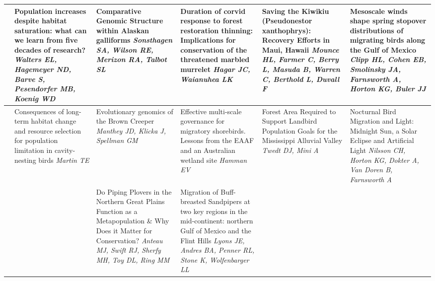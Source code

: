 \begin{tabular}{|x{0.75cm}|a{2.25cm}|x{2.25cm}|x{2.25cm}|x{2.25cm}|x{2.25cm}|}
\hline
{}&Population increases despite habitat saturation: what can we learn from five decades of research? \newline \newline \textit{Walters EL, Hagemeyer ND, Barve S, Pesendorfer MB, Koenig WD} & Comparative Genomic Structure within Alaskan galliforms \newline \newline \textit{Sonsthagen SA, Wilson RE, Merizon RA, Talbot SL} & Duration of corvid response to forest restoration thinning: Implications for conservation of the threatened marbled murrelet \newline \newline \textit{Hagar JC, Waianuhea LK} & Saving the Kiwikiu (Pseudonestor xanthophrys): Recovery Efforts in Maui, Hawaii \newline \newline \textit{Mounce HL, Farmer C, Berry L, Masuda B, Warren C, Berthold L, Duvall F} & Mesoscale winds shape spring stopover distributions of migrating birds along the Gulf of Mexico \newline \newline \textit{Clipp HL, Cohen EB, Smolinsky JA, Farnsworth A, Horton KG, Buler JJ}\\
\hline
{}&Consequences of long-term habitat change and resource selection for population limitation in cavity-nesting birds \newline \newline \textit{Martin TE} & Evolutionary genomics of the Brown Creeper \newline \newline \textit{Manthey JD, Klicka J, Spellman GM} & Effective multi-scale governance for migratory shorebirds. Lessons from the EAAF and an Australian wetland site \newline \newline \textit{Hamman EV} & Forest Area Required to Support Landbird Population Goals for the Mississippi Alluvial Valley \newline \newline \textit{Twedt DJ, Mini A} & Nocturnal Bird Migration and Light: Midnight Sun, a Solar Eclipse and Artificial Light \newline \newline \textit{Nilsson CH, Horton KG, Dokter A, Van Doren B, Farnsworth A}\\
\hline
{}& \newline \newline \textit{} & Do Piping Plovers in the Northern Great Plains Function as a Metapopulation \& Why Does it Matter for Conservation? \newline \newline \textit{Anteau MJ, Swift RJ, Sherfy MH, Toy DL, Ring MM} & Migration of Buff-breasted Sandpipers at two key regions in the mid-continent: northern Gulf of Mexico and the Flint Hills \newline \newline \textit{Lyons JE, Andres BA, Penner RL, Stone K, Wolfenbarger LL}\\

\end{tabular}
